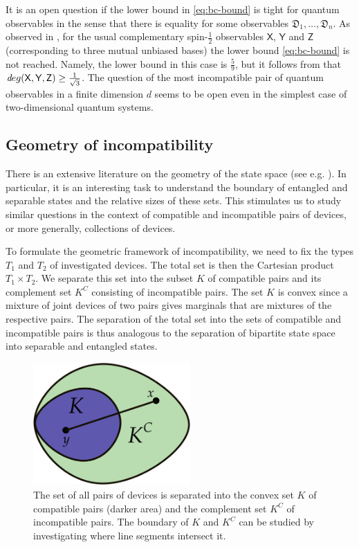 \documentclass[12pt]{article}
\theoremstyle{definition}
\newcommand{\half}{\tfrac{1}{2}} %
\newcommand{\Dev}{\mathfrak{D}} %
\def\deg{\textit deg}
\begin{document}
It is an open question if the lower bound in \eqref{eq:bc-bound} is tight for quantum observables in the sense that there is equality for some observables $\Dev_1,\ldots,\Dev_n$. 
As observed in \cite{DaMaSa01}, for the usual complementary spin-$\half$ observables $\mathsf{X}$, $\mathsf{Y}$ and $\mathsf{Z}$ (corresponding to three mutual unbiased bases) the lower bound \eqref{eq:bc-bound} is not reached.
Namely, the lower bound in this case is $\frac{5}{9}$, but it follows from \cite{Busch86} that
$\deg(\mathsf{X},\mathsf{Y},\mathsf{Z}) \geq \frac{1}{\sqrt{3}}$. 
The question of the most incompatible pair of quantum observables in a finite dimension $d$ seems to be open even in the simplest case of two-dimensional quantum systems.

\subsection{Geometry of incompatibility}

There is an extensive literature on the geometry of the state space (see e.g. \cite{GQS06}).
In particular, it is an interesting task to understand the boundary of entangled and separable states and the relative sizes of these sets.
This stimulates us to study similar questions in the context of compatible and incompatible pairs of devices, or more generally, collections of devices.

To formulate the geometric framework of incompatibility, we need to fix the types $T_1$ and $T_2$ of investigated devices.
The total set is then the Cartesian product $T_1\times T_2$.
We separate this set into the subset $K$ of compatible pairs and its complement set $K^C$ consisting of incompatible pairs.
The set $K$ is convex since a mixture of joint devices of two pairs gives marginals that are mixtures of the respective pairs. 
The separation of the total set into the sets of compatible and incompatible pairs is thus analogous to the separation of bipartite state space into separable and entangled states.

\begin{figure}\begin{center}
\includegraphics[width=6cm]{fig_geometry.png}
\caption{The set of all pairs of devices is separated into the convex set $K$ of compatible pairs (darker area) and the complement set $K^C$ of incompatible pairs.
The boundary of $K$ and $K^C$ can be studied by investigating where line segments intersect it.}
\label{fig:geometry}
\end{center}
\end{figure}
\end{document}

